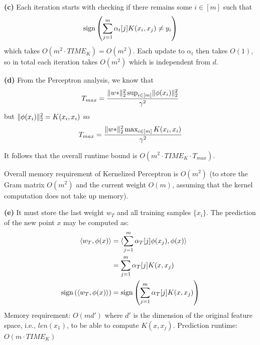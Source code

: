 \documentclass[a4paper, 12pt]{article}
\begin{document}
\textbf{(c)}
Each iteration starts with checking if there remains some $i \in [m]$ such that 
\[    
    \mathrm{sign}\left(\sum_{j=1}^{m} \alpha_t[j] K(x_i, x_j) \neq y_i\right)
\]
which takes $O(m^2 \cdot TIME_K) = O(m^2)$. Each update to $\alpha_t$ then takes $O(1)$, so in total each iteration takes $O(m^2)$ which is independent from $d$.

\textbf{(d)}
From the Perceptron analysis, we know that \begin{equation*}
T_{max} = \frac{\lVert w*\rVert_2^2 \sup_{i \in [m]} \lVert\phi(x_i)\rVert_2^2}{\gamma^2}
\end{equation*}
but $\lVert\phi(x_i)\rVert_2^2 = K(x_i, x_i)$ so \begin{equation*}
T_{max} =\frac{\lVert w*\rVert_2^2 \max_{i \in [m]} K(x_i, x_i)}{\gamma^2}
\end{equation*}

It follows that the overall runtime bound is $O\left(m^2 \cdot TIME_K \cdot T_{max}\right)$.

Overall memory requirement of Kernelized Perceptron is $O(m^2)$ (to store the Gram matrix $O(m^2)$ and the current weight $O(m)$, assuming that the kernel computation does not take up memory).

\textbf{(e)} It must store the last weight $w_T$ and all training samples $\{x_i\}$. The prediction of the new point $x$ may be computed as:
\begin{align*}
    \langle w_T, \phi(x) \rangle &= \langle \sum_{j=1}^{m} \alpha_T[j] \phi(x_j), \phi(x) \rangle \\
    &= \sum_{j=1}^{m} \alpha_T[j] K(x, x_j) \\
    \mathrm{sign}\left( \langle w_T, \phi(x) \rangle\right) &= \mathrm{sign}\left(\sum_{j=1}^{m} \alpha_T[j] K(x, x_j)\right)
\end{align*}
Memory requirement: $O(md')$ where $d'$ is the dimension of the original feature space, i.e., $len(x_1)$, to be able to compute $K(x, x_j)$.
Prediction runtime: $O(m \cdot TIME_K)$
\end{document}
